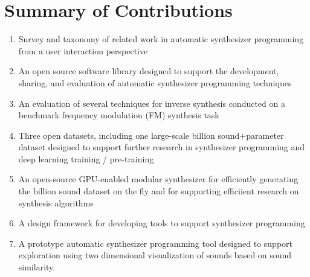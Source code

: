 %
%
%
%
%
%
%

\section{Summary of Contributions}

\begin{enumerate}
    \item Survey and taxonomy of related work in automatic synthesizer programming from a user interaction perspective
    \item An open source software library designed to support the development, sharing, and evaluation of automatic synthesizer programming techniques
    \item An evaluation of several techniques for inverse synthesis conducted on a benchmark frequency modulation (FM) synthesis task
    \item Three open datasets, including one large-scale billion sound+parameter dataset designed to support further research in synthesizer programming and deep learning training / pre-training
    \item An open-source GPU-enabled modular synthesizer for efficiently generating the billion sound dataset on the fly and for supporting efficiient research on synthesis algorithms
    \item A design framework for developing tools to support synthesizer programming
    \item A prototype automatic synthesizer programming tool designed to support exploration using two dimensional visualization of sounds based on sound similarity.
\end{enumerate}

